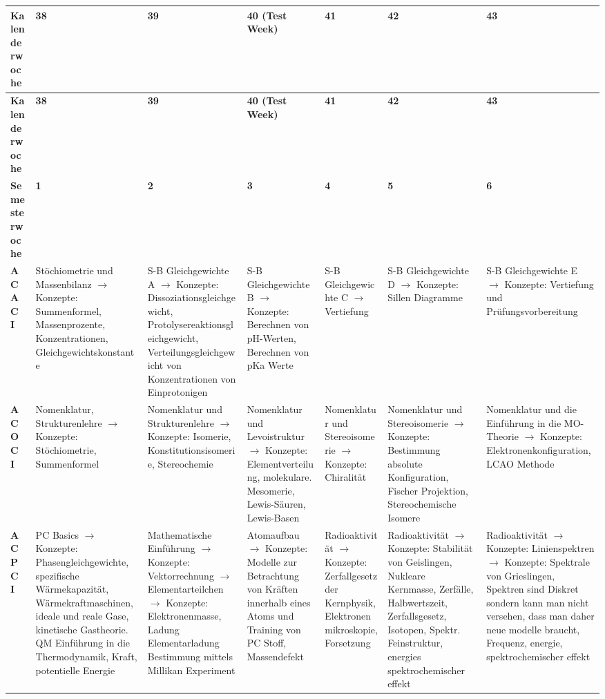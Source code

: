 \documentclass[a4paper]{article}
\begin{document}
\begin{longtable}{|p{2.5cm}|*{6}{p{2.3cm}|}}
\hline
\textbf{Kalenderwoche} & \textbf{38} & \textbf{39} & \textbf{40 (Test Week)} & \textbf{41} & \textbf{42} & \textbf{43} \\
\hline
\endfirsthead

\hline
\textbf{Kalenderwoche} & \textbf{38} & \textbf{39} & \textbf{40 (Test Week)} & \textbf{41} & \textbf{42} & \textbf{43} \\
\hline
\endhead

\textbf{Semesterwoche} & \textbf{1} & \textbf{2} & \textbf{3} & \textbf{4} & \textbf{5} & \textbf{6} \\
\hline

\textbf{ACAC I} & Stöchiometrie und Massenbilanz $\rightarrow$ Konzepte: Summenformel, Massenprozente, Konzentrationen, Gleichgewichtskonstante & S-B Gleichgewichte A $\rightarrow$ Konzepte: Dissoziationsgleichgewicht, Protolysereaktionsgleichgewicht, Verteilungsgleichgewicht von Konzentrationen von Einprotonigen & S-B Gleichgewichte B $\rightarrow$ Konzepte: Berechnen von pH-Werten, Berechnen von pKa Werte & S-B Gleichgewichte C $\rightarrow$ Vertiefung & S-B Gleichgewichte D $\rightarrow$ Konzepte: Sillen Diagramme & S-B Gleichgewichte E $\rightarrow$ Konzepte: Vertiefung und Prüfungsvorbereitung \\
\hline

\textbf{ACOC I} & Nomenklatur, Strukturenlehre $\rightarrow$ Konzepte: Stöchiometrie, Summenformel & Nomenklatur und Strukturenlehre $\rightarrow$ Konzepte: Isomerie, Konstitutionsisomerie, Stereochemie & Nomenklatur und Levoistruktur $\rightarrow$ Konzepte: Elementverteilung, molekulare. Mesomerie, Lewis-Säuren, Lewis-Basen & Nomenklatur und Stereoisomerie $\rightarrow$ Konzepte: Chiralität & Nomenklatur und Stereoisomerie $\rightarrow$ Konzepte: Bestimmung absolute Konfiguration, Fischer Projektion, Stereochemische Isomere & Nomenklatur und die Einführung in die MO-Theorie $\rightarrow$ Konzepte: Elektronenkonfiguration, LCAO Methode \\
\hline

\textbf{ACPC I} & PC Basics $\rightarrow$ Konzepte: Phasengleichgewichte, spezifische Wärmekapazität, Wärmekraftmaschinen, ideale und reale Gase, kinetische Gastheorie. QM Einführung in die Thermodynamik, Kraft, potentielle Energie & Mathematische Einführung $\rightarrow$ Konzepte: Vektorrechnung $\rightarrow$ Elementarteilchen $\rightarrow$ Konzepte: Elektronenmasse, Ladung Elementarladung Bestimmung mittels Millikan Experiment & Atomaufbau $\rightarrow$ Konzepte: Modelle zur Betrachtung von Kräften innerhalb eines Atoms und Training von PC Stoff, Massendefekt & Radioaktivität $\rightarrow$ Konzepte: Zerfallgesetz der Kernphysik, Elektronenmikroskopie, Forsetzung & Radioaktivität $\rightarrow$ Konzepte: Stabilität von Geislingen, Nukleare Kernmasse, Zerfälle, Halbwertszeit, Zerfallsgesetz, Isotopen, Spektr. Feinstruktur, energies spektrochemischer effekt & Radioaktivität $\rightarrow$ Konzepte: Linienspektren $\rightarrow$ Konzepte: Spektrale von Grieslingen, Spektren sind Diskret sondern kann man nicht versehen, dass man daher neue modelle braucht, Frequenz, energie, spektrochemischer effekt \\
\hline


\end{longtable}
\end{document}
